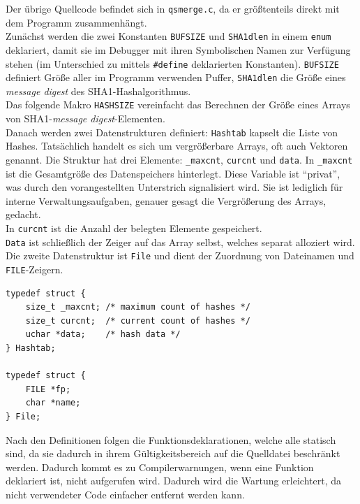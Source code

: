 \documentclass[a4paper,titlepage,12pt]{scrartcl}
\begin{document}
Der übrige Quellcode befindet sich in \texttt{qsmerge.c},
da er größtenteils direkt mit dem Programm zusammenhängt.
\\
Zunächst werden die zwei Konstanten \texttt{BUFSIZE} und \texttt{SHA1dlen} in einem \texttt{enum} deklariert,
damit sie im Debugger mit ihren Symbolischen Namen zur Verfügung stehen
(im Unterschied zu mittels \texttt{\#define} deklarierten Konstanten).
\texttt{BUFSIZE} definiert Größe aller im Programm verwenden Puffer,
\texttt{SHA1dlen} die Größe eines \emph{message digest} des SHA1-Hashalgorithmus.
\\
Das folgende Makro \texttt{HASHSIZE} vereinfacht das Berechnen der Größe eines Arrays von SHA1-\emph{message digest}-Elementen.
\\
Danach werden zwei Datenstrukturen definiert:
\texttt{Hashtab} kapselt die Liste von Hashes.
Tatsächlich handelt es sich um vergrößerbare Arrays,
oft auch Vektoren genannt.
Die Struktur hat drei Elemente: \texttt{\_maxcnt}, \texttt{curcnt} und \texttt{data}.
In \texttt{\_maxcnt} ist die Gesamtgröße des Datenspeichers hinterlegt.
Diese Variable ist ``privat'',
was durch den vorangestellten Unterstrich signalisiert wird.
Sie ist lediglich für interne Verwaltungsaufgaben,
genauer gesagt die Vergrößerung des Arrays,
gedacht.
\\
In \texttt{curcnt} ist die Anzahl der belegten Elemente gespeichert.
\\
\texttt{Data} ist schließlich der Zeiger auf das Array selbst,
welches separat alloziert wird.
\\
Die zweite Datenstruktur ist \texttt{File} und dient der Zuordnung von Dateinamen und \texttt{FILE}-Zeigern.
\lstset{language=C,numbers=left,xleftmargin=20pt}
\begin{lstlisting}
typedef struct {
	size_t _maxcnt;	/* maximum count of hashes */
	size_t curcnt;	/* current count of hashes */
	uchar *data;	/* hash data */
} Hashtab;

typedef struct {
	FILE *fp;
	char *name;
} File;
\end{lstlisting}

Nach den Definitionen folgen die Funktionsdeklarationen,
welche alle statisch sind,
da sie dadurch in ihrem Gültigkeitsbereich auf die Quelldatei beschränkt werden.
Dadurch kommt es zu Compilerwarnungen,
wenn eine Funktion deklariert ist,
nicht aufgerufen wird.
Dadurch wird die Wartung erleichtert,
da nicht verwendeter Code einfacher entfernt werden kann.
\end{document}
